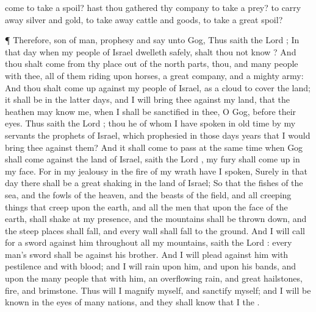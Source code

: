 {come to
take a
spoil? hast thou
gathered thy
company to
take a
prey? to carry
away
silver and
gold, to take
away
cattle and
goods, to
take a
great
spoil?
\par }{\PP {}¶ Therefore,
son of
man,
prophesy and
say unto
Gog, Thus
saith the
Lord
{}; In that
day when my
people of
Israel
dwelleth
safely, shalt thou not
know
{}?
And thou shalt
come from thy
place out of the
north
parts, thou, and
many
people with thee, all of them
riding upon
horses, a
great
company, and a
mighty
army:
And thou shalt come
up against my
people of
Israel, as a
cloud to
cover the
land; it shall be in the
latter
days, and I will
bring thee against my
land, that the
heathen may
know me, when I shall be
sanctified in thee, O
Gog, before their
eyes.
Thus
saith the
Lord
{};
{} thou he of whom I have
spoken in
old
time
by my
servants the
prophets of
Israel, which
prophesied in those
days
{}
years that I would
bring thee against them?
And it shall come to pass at the same
time
when
Gog shall
come against the
land of
Israel,
saith the
Lord
{},
{} my
fury shall come
up in my
face.
For in my
jealousy
{} in the
fire of my
wrath have I
spoken, Surely in that
day there shall be a
great
shaking in the
land of
Israel;
So that the
fishes of the
sea, and the
fowls of the
heaven, and the
beasts of the
field, and all creeping
things that
creep upon the
earth, and all the
men that
{} upon the
face of the
earth, shall
shake at my
presence, and the
mountains shall be thrown
down, and the steep
places shall
fall, and every
wall shall
fall to the
ground.
And I will
call for a
sword against him throughout all my
mountains,
saith the
Lord
{}: every
man’s
sword shall be against his
brother.
And I will
plead against him with
pestilence and with
blood; and I will
rain upon him, and upon his
bands, and upon the
many
people that
{} with him, an
overflowing
rain, and great
hailstones,
fire, and
brimstone.
Thus will I
magnify myself, and
sanctify myself; and I will be
known in the
eyes of
many
nations, and they shall
know that I
{} the
{}.

}
